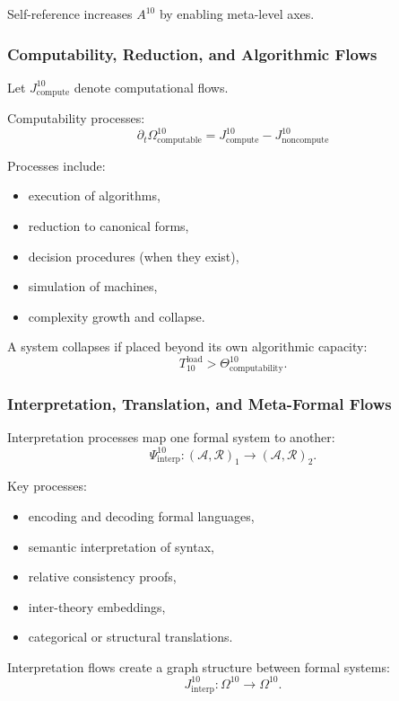 Self-reference increases $A^{10}$ by enabling meta-level axes.

\subsubsection{Computability, Reduction, and Algorithmic Flows}

Let $J^{10}_{\text{compute}}$ denote computational flows.

Computability processes:
\[
\partial_t \Omega^{10}_{\text{computable}}
= J^{10}_{\text{compute}} - J^{10}_{\text{noncompute}}
\]

Processes include:
\begin{itemize}
    \item execution of algorithms,
    \item reduction to canonical forms,
    \item decision procedures (when they exist),
    \item simulation of machines,
    \item complexity growth and collapse.
\end{itemize}

A system collapses if placed beyond its own algorithmic capacity:
\[
T_{10}^{\text{load}} > \Theta^{10}_{\text{computability}}.
\]

\subsubsection{Interpretation, Translation, and Meta-Formal Flows}

Interpretation processes map one formal system to another:
\[
\Psi^{10}_{\text{interp}} :
(\mathcal{A},\mathcal{R})_1 \to (\mathcal{A},\mathcal{R})_2.
\]

Key processes:
\begin{itemize}
    \item encoding and decoding formal languages,
    \item semantic interpretation of syntax,
    \item relative consistency proofs,
    \item inter-theory embeddings,
    \item categorical or structural translations.
\end{itemize}

Interpretation flows create a graph structure between formal systems:
\[
J^{10}_{\text{interp}} : \Omega^{10} \to \Omega^{10}.
\]

